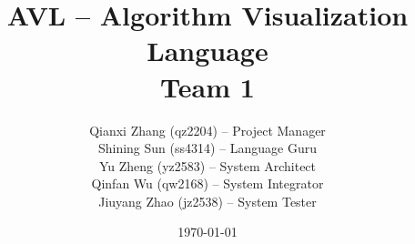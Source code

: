 \documentclass[11pt]{article}
\begin{document}
\title{AVL -- Algorithm Visualization Language \\
  Team 1
}
\author{Qianxi Zhang (qz2204) -- Project Manager \\
  Shining Sun (ss4314) -- Language Guru \\
  Yu Zheng (yz2583) -- System Architect \\
  Qinfan Wu (qw2168) -- System Integrator \\
  Jiuyang Zhao (jz2538) -- System Tester
}
\date{\today}
\maketitle
\newpage

\tableofcontents
\newpage


\newpage

\newpage

\newpage

\newpage

\newpage

\newpage

\newpage

\newpage

\newpage

\end{document}
